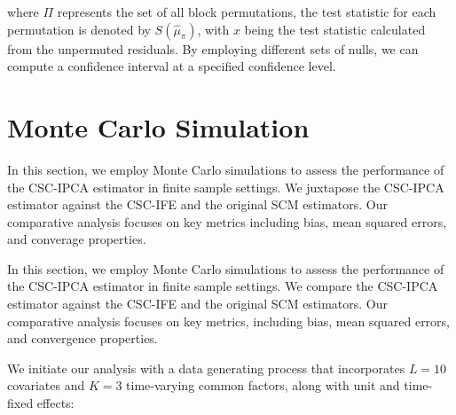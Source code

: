 \documentclass[12pt]{article}
\begin{document}
\noindent where $\Pi$ represents the set of all block permutations, the test statistic for each permutation is denoted by $S(\hat{\mu}_{\pi})$, with $x$ being the test statistic calculated from the unpermuted residuals. By employing different sets of nulls, we can compute a confidence interval at a specified confidence level.

\section{Monte Carlo Simulation}
\label{sec: simulation}

In this section, we employ Monte Carlo simulations to assess the performance of the CSC-IPCA estimator in finite sample settings. We juxtapose the CSC-IPCA estimator against the CSC-IFE and the original SCM estimators. Our comparative analysis focuses on key metrics including bias, mean squared errors, and converage properties. 

In this section, we employ Monte Carlo simulations to assess the performance of the CSC-IPCA estimator in finite sample settings. We compare the CSC-IPCA estimator against the CSC-IFE and the original SCM estimators. Our comparative analysis focuses on key metrics, including bias, mean squared errors, and convergence properties.

We initiate our analysis with a data generating process that incorporates $L=10$ covariates and $K=3$ time-varying common factors, along with unit and time-fixed effects:
\end{document}
